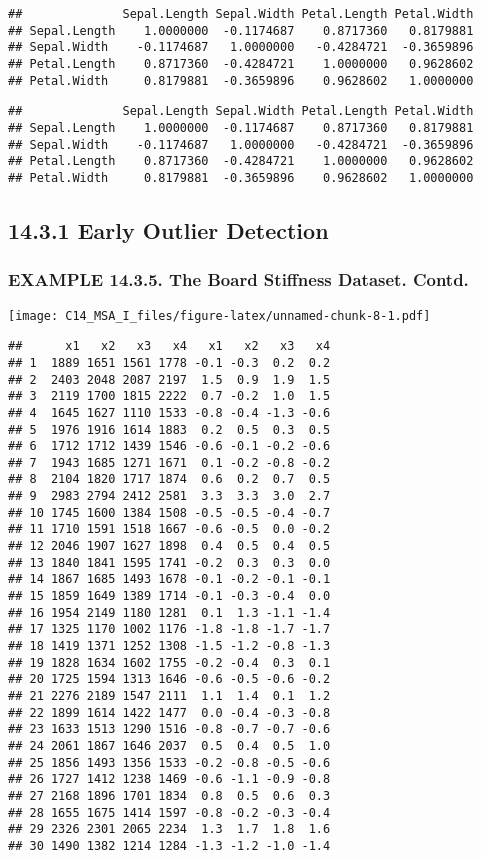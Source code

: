 \documentclass[]{article}
\begin{document}
\begin{verbatim}
##              Sepal.Length Sepal.Width Petal.Length Petal.Width
## Sepal.Length    1.0000000  -0.1174687    0.8717360   0.8179881
## Sepal.Width    -0.1174687   1.0000000   -0.4284721  -0.3659896
## Petal.Length    0.8717360  -0.4284721    1.0000000   0.9628602
## Petal.Width     0.8179881  -0.3659896    0.9628602   1.0000000
\end{verbatim}

\begin{verbatim}
##              Sepal.Length Sepal.Width Petal.Length Petal.Width
## Sepal.Length    1.0000000  -0.1174687    0.8717360   0.8179881
## Sepal.Width    -0.1174687   1.0000000   -0.4284721  -0.3659896
## Petal.Length    0.8717360  -0.4284721    1.0000000   0.9628602
## Petal.Width     0.8179881  -0.3659896    0.9628602   1.0000000
\end{verbatim}

\hypertarget{early-outlier-detection}{%
\subsection{14.3.1 Early Outlier
Detection}\label{early-outlier-detection}}

\hypertarget{example-14.3.5.-the-board-stiffness-dataset.-contd.}{%
\subsubsection{EXAMPLE 14.3.5. The Board Stiffness Dataset.
Contd.}\label{example-14.3.5.-the-board-stiffness-dataset.-contd.}}

\texttt{[image: C14\_MSA\_I\_files/figure-latex/unnamed-chunk-8-1.pdf]}

\begin{verbatim}
##      x1   x2   x3   x4   x1   x2   x3   x4
## 1  1889 1651 1561 1778 -0.1 -0.3  0.2  0.2
## 2  2403 2048 2087 2197  1.5  0.9  1.9  1.5
## 3  2119 1700 1815 2222  0.7 -0.2  1.0  1.5
## 4  1645 1627 1110 1533 -0.8 -0.4 -1.3 -0.6
## 5  1976 1916 1614 1883  0.2  0.5  0.3  0.5
## 6  1712 1712 1439 1546 -0.6 -0.1 -0.2 -0.6
## 7  1943 1685 1271 1671  0.1 -0.2 -0.8 -0.2
## 8  2104 1820 1717 1874  0.6  0.2  0.7  0.5
## 9  2983 2794 2412 2581  3.3  3.3  3.0  2.7
## 10 1745 1600 1384 1508 -0.5 -0.5 -0.4 -0.7
## 11 1710 1591 1518 1667 -0.6 -0.5  0.0 -0.2
## 12 2046 1907 1627 1898  0.4  0.5  0.4  0.5
## 13 1840 1841 1595 1741 -0.2  0.3  0.3  0.0
## 14 1867 1685 1493 1678 -0.1 -0.2 -0.1 -0.1
## 15 1859 1649 1389 1714 -0.1 -0.3 -0.4  0.0
## 16 1954 2149 1180 1281  0.1  1.3 -1.1 -1.4
## 17 1325 1170 1002 1176 -1.8 -1.8 -1.7 -1.7
## 18 1419 1371 1252 1308 -1.5 -1.2 -0.8 -1.3
## 19 1828 1634 1602 1755 -0.2 -0.4  0.3  0.1
## 20 1725 1594 1313 1646 -0.6 -0.5 -0.6 -0.2
## 21 2276 2189 1547 2111  1.1  1.4  0.1  1.2
## 22 1899 1614 1422 1477  0.0 -0.4 -0.3 -0.8
## 23 1633 1513 1290 1516 -0.8 -0.7 -0.7 -0.6
## 24 2061 1867 1646 2037  0.5  0.4  0.5  1.0
## 25 1856 1493 1356 1533 -0.2 -0.8 -0.5 -0.6
## 26 1727 1412 1238 1469 -0.6 -1.1 -0.9 -0.8
## 27 2168 1896 1701 1834  0.8  0.5  0.6  0.3
## 28 1655 1675 1414 1597 -0.8 -0.2 -0.3 -0.4
## 29 2326 2301 2065 2234  1.3  1.7  1.8  1.6
## 30 1490 1382 1214 1284 -1.3 -1.2 -1.0 -1.4
\end{verbatim}
\end{document}
